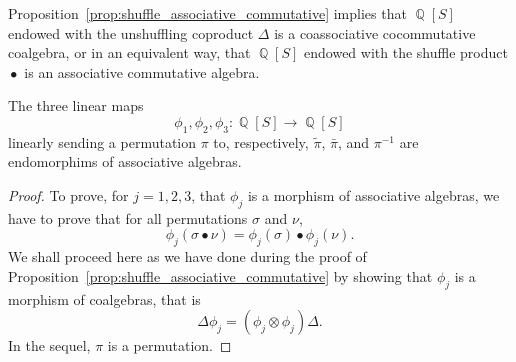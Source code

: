 \documentclass[a4paper,10pt]{llncs}
\DeclareMathOperator{\QQ}{\mathbb{Q}}
\DeclareMathOperator{\SHUFFLE}{\bullet}
\begin{document}
Proposition~\ref{prop:shuffle_associative_commutative} implies that
$\QQ[S]$ endowed with the unshuffling coproduct $\Delta$ is a
coassociative cocommutative coalgebra, or in an equivalent way, that
$\QQ[S]$ endowed with the shuffle product $\SHUFFLE$ is an associative
commutative algebra.
\medskip

\begin{proposition} \label{prop:endomorphisms}
    The three linear maps
    \begin{equation}
        \phi_1, \phi_2, \phi_3 : \QQ[S] \to \QQ[S]
    \end{equation}
    linearly sending a permutation $\pi$ to, respectively,
    $\widetilde{\pi}$, $\bar \pi$, and $\pi^{-1}$ are endomorphims of
    associative algebras.
\end{proposition}
\begin{proof}
    To prove, for $j = 1, 2, 3$, that $\phi_j$ is a morphism of
    associative algebras, we have to prove that for all permutations
    $\sigma$ and $\nu$,
    \begin{equation}
        \phi_j(\sigma \SHUFFLE \nu) =
        \phi_j(\sigma) \SHUFFLE \phi_j(\nu).
    \end{equation}
    We shall proceed here as we have done during the proof of
    Proposition~\ref{prop:shuffle_associative_commutative} by showing
    that $\phi_j$ is a morphism of coalgebras, that is
    \begin{equation}
        \Delta \phi_j = (\phi_j \otimes \phi_j) \Delta.
    \end{equation}
    In the sequel, $\pi$ is a permutation.
    \smallskip


\end{proof}
\end{document}
